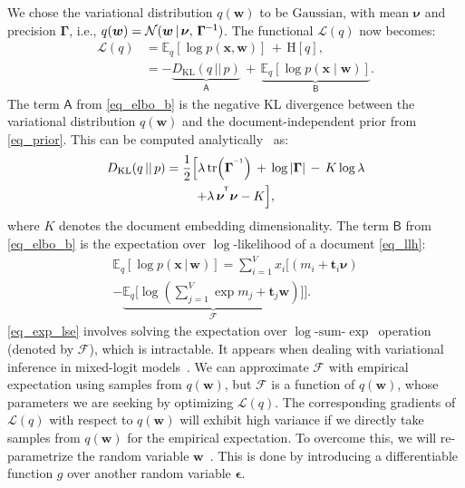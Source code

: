 \documentclass[journal]{IEEEtran}
\newcommand*{\T}{^{\mkern-1.2mu\mathsf{T}}}     \newcommand*{\I}{^{\mkern-1.2mu\mathsf{-1}}}    \newcommand*{\IT}{^{\mkern-1.2mu\mathsf{-T}}}   \newcommand*{\ts}{_{\mkern-1.2mu\mathsf{t}}}    \newcommand{\nr}[1]{_{\mkern+2.0mu\mathsf{#1}}}
\newcommand{\mb}[1]{\bm{#1}}
\newcommand{\bs}[1]{\bm{#1}}
\newcommand{\kl}{D_{\mathrm{KL}}}
\newcommand{\lse}{\(\log\)-\(\mathrm{sum}\)-\(\exp\)}      \newcommand{\Dir}{\(\mathrm{Dirichlet}\)}
\newcommand{\Gau}{\(\mathrm{Gaussian}\)}
\begin{document}
We chose the variational distribution \(q(\mb{w})\) to be \Gau, with mean \(\bs{\nu}\) and precision \(\bs{\Gamma}\), i.e., \(q(\mb{w}) = \mathcal{N}(\mb{w} \,|\,\bs{\nu}, \, \bs{\Gamma}\I)\). The functional \(\mathcal{L}(q)\) now becomes:
\begin{align}
\mathcal{L}(q) &= \mathbb{E}_q[\log p(\mb{x}, \mb{w})] \,+\, \mathrm{H}[q], \\
&= -\underbrace{\kl(q \,||\, p)}_{\mathsf{A}} \,+\, 
\underbrace{\mathbb{E}_q[\log p(\mb{x} \mid \mb{w})]}_{\mathsf{B}}. 
\label{eq_elbo_b}
\end{align}
The term \(\mathsf{A}\) from \eqref{eq_elbo_b} is the negative
KL divergence between the variational distribution \(q(\mb{w})\)
and the document-independent prior from \eqref{eq_prior}. This can be 
computed analytically~\cite{cookbook} as:
\begin{multline}
\label{eq_kld_prior}
D_{\mathrm{KL}}(q \,||\, p) = \frac{1}{2} \Big[\lambda \tr (\bs{\Gamma}^{\I}) \,+\, \log |\bs{\Gamma}| \,-\, K \log \lambda \\
+ \lambda \, \bs{\nu}^{\T} \bs{\nu} - K \Big],
\end{multline}
where \(K\) denotes the document embedding dimensionality. The term 
\(\mathsf{B}\) from \eqref{eq_elbo_b} is the expectation over
\(\log\)-likelihood of a document \eqref{eq_llh}:
\begin{multline}
\label{eq_exp_lse}
\mathbb{E}_q[\log p(\mb{x} \,|\, \mb{w})] = \sum_{i=1}^{V} x_i \Bigg[(m_i + \mb{t}_i\bs{\nu}) \\
-\underbrace{\mathbb{E}_q \Big[\log (\sum_{j=1}^V \exp{m_{j} + \mb{t}_j \mb{w}}) \Big]}_{\mathcal{F}} \Bigg].
\end{multline}
\eqref{eq_exp_lse} involves solving the expectation over \lse~operation 
(denoted by \(\mathcal{F}\)), which is intractable. It appears when dealing 
with variational inference in mixed-logit 
models~\cite{Blei:2005:CTM,Depraetere:2017:mixed}. We can approximate 
\(\mathcal{F}\) with empirical expectation using samples from \(q(\mb{w})\), 
but \(\mathcal{F}\) is a function of \(q(\mb{w})\), whose parameters we are 
seeking by optimizing \(\mathcal{L}(q)\). The corresponding gradients of 
\(\mathcal{L}(q)\) with respect to \(q(\mb{w})\) will exhibit high variance if 
we directly take samples from \(q(\mb{w})\) for the empirical expectation. To 
overcome this, we will re-parametrize the random variable 
\(\mb{w}\)~\cite{Kingma:2014:AEVB}. This is done by introducing a 
differentiable function \(g\) over another random variable \(\bs{\epsilon}\). 
\end{document}
